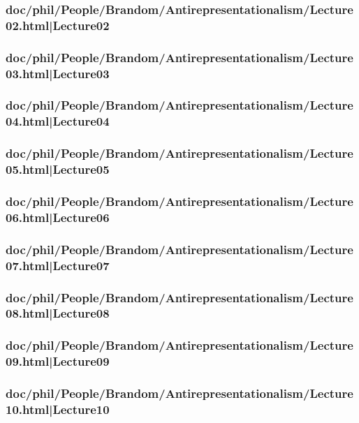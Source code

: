 \documentclass[12pt,a4paper]{report}
\begin{document}
\subsubsection{doc/phil/People/Brandom/Antirepresentationalism/Lecture02.html|Lecture02}

\subsubsection{doc/phil/People/Brandom/Antirepresentationalism/Lecture03.html|Lecture03}

\subsubsection{doc/phil/People/Brandom/Antirepresentationalism/Lecture04.html|Lecture04}

\subsubsection{doc/phil/People/Brandom/Antirepresentationalism/Lecture05.html|Lecture05}

\subsubsection{doc/phil/People/Brandom/Antirepresentationalism/Lecture06.html|Lecture06}

\subsubsection{doc/phil/People/Brandom/Antirepresentationalism/Lecture07.html|Lecture07}

\subsubsection{doc/phil/People/Brandom/Antirepresentationalism/Lecture08.html|Lecture08}

\subsubsection{doc/phil/People/Brandom/Antirepresentationalism/Lecture09.html|Lecture09}

\subsubsection{doc/phil/People/Brandom/Antirepresentationalism/Lecture10.html|Lecture10}
\end{document}
